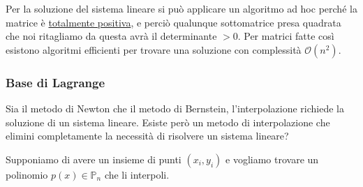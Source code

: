 \documentclass{article}
\begin{document}
Per la soluzione del sistema lineare si può applicare un algoritmo ad hoc
perché la matrice è \underline{totalmente positiva}, e perciò qualunque
sottomatrice presa quadrata che noi ritagliamo da questa avrà il determinante
$>0$. Per matrici fatte così esistono algoritmi efficienti per trovare una
soluzione con complessità $\mathcal{O}(n^2)$.
\subsubsection{Base di Lagrange}
Sia il metodo di Newton che il metodo di Bernstein, l'interpolazione richiede
la soluzione di un sistema lineare. Esiste però un metodo di interpolazione
che elimini completamente la necessità di risolvere un sistema lineare? 

Supponiamo di avere un insieme di punti $(x_i,y_i)$ e vogliamo trovare un
polinomio $p(x)\in \mathbb{P}_n$ che li interpoli. 
\end{document}
